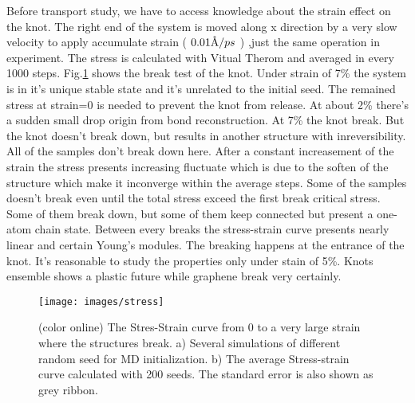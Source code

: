 \documentclass[%
 reprint,
 amsmath,amssymb,
 aps,
prb,
]{revtex4-1}
\newcommand{\angstrom}{\mbox{\normalfont\AA}}
\begin{document}
Before transport study, we have to access knowledge about the strain effect on the knot. The right end of the system is moved along x direction by a very slow velocity to apply accumulate strain ( $0.01 \angstrom / ps$ ) ,just the same operation in experiment. The stress is calculated with Vitual Therom and averaged in every 1000 steps. Fig.\ref{fig:stress} shows the break test of the knot. Under strain of 7\% the system is in it's unique stable state and it's unrelated to the initial seed. The remained stress at strain=0 is needed to prevent  the knot from release. At about 2\% there's a sudden small drop origin from bond reconstruction. At 7\% the knot break. But the knot doesn't break down, but results in another structure with inreversibility. All of the samples don't break down here. After a constant increasement of the strain the stress presents increasing fluctuate which is due to the soften of the structure which make it inconverge within the average steps. Some of the samples doesn't break even until the total stress exceed the first break critical stress. Some of them break down, but some of them keep connected but present a one-atom chain state. Between every breaks the stress-strain curve presents nearly linear and certain Young's modules.
The breaking happens at the entrance of the knot.
It's reasonable to study the properties only under stain of 5\%.
Knots ensemble shows a plastic future while graphene break very certainly.
\begin{figure}[b]
  \texttt{[image: images/stress]}
  \caption{\label{fig:stress}  (color online) The Stres-Strain curve from 0 to a very large strain where the structures break. a) Several simulations of different random seed for MD initialization. b) The average Stress-strain curve calculated with 200 seeds. The standard error is also shown as grey ribbon.}
\end{figure}
\end{document}
